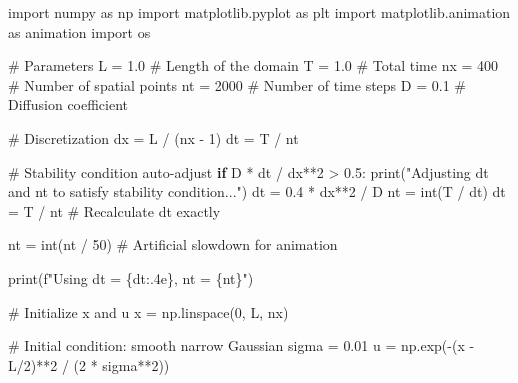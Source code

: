 \documentclass[
  letterpaper,
  enabledeprecatedfontcommands]{report}
\newenvironment{Shaded}{\begin{snugshade}}{\end{snugshade}}
\newcommand{\BuiltInTok}[1]{\textcolor[rgb]{0.00,0.23,0.31}{#1}}
\newcommand{\CommentTok}[1]{\textcolor[rgb]{0.37,0.37,0.37}{#1}}
\newcommand{\ControlFlowTok}[1]{\textcolor[rgb]{0.00,0.23,0.31}{\textbf{#1}}}
\newcommand{\DecValTok}[1]{\textcolor[rgb]{0.68,0.00,0.00}{#1}}
\newcommand{\FloatTok}[1]{\textcolor[rgb]{0.68,0.00,0.00}{#1}}
\newcommand{\ImportTok}[1]{\textcolor[rgb]{0.00,0.46,0.62}{#1}}
\newcommand{\NormalTok}[1]{\textcolor[rgb]{0.00,0.23,0.31}{#1}}
\newcommand{\OperatorTok}[1]{\textcolor[rgb]{0.37,0.37,0.37}{#1}}
\newcommand{\SpecialCharTok}[1]{\textcolor[rgb]{0.37,0.37,0.37}{#1}}
\newcommand{\SpecialStringTok}[1]{\textcolor[rgb]{0.13,0.47,0.30}{#1}}
\newcommand{\StringTok}[1]{\textcolor[rgb]{0.13,0.47,0.30}{#1}}
\begin{document}
\begin{Shaded}
\begin{Highlighting}[]
\ImportTok{import}\NormalTok{ numpy }\ImportTok{as}\NormalTok{ np}
\ImportTok{import}\NormalTok{ matplotlib.pyplot }\ImportTok{as}\NormalTok{ plt}
\ImportTok{import}\NormalTok{ matplotlib.animation }\ImportTok{as}\NormalTok{ animation}
\ImportTok{import}\NormalTok{ os}

\CommentTok{\# Parameters}
\NormalTok{L }\OperatorTok{=} \FloatTok{1.0}        \CommentTok{\# Length of the domain}
\NormalTok{T }\OperatorTok{=} \FloatTok{1.0}        \CommentTok{\# Total time }
\NormalTok{nx }\OperatorTok{=} \DecValTok{400}       \CommentTok{\# Number of spatial points}
\NormalTok{nt }\OperatorTok{=} \DecValTok{2000}      \CommentTok{\# Number of time steps}
\NormalTok{D }\OperatorTok{=} \FloatTok{0.1}        \CommentTok{\# Diffusion coefficient}

\CommentTok{\# Discretization}
\NormalTok{dx }\OperatorTok{=}\NormalTok{ L }\OperatorTok{/}\NormalTok{ (nx }\OperatorTok{{-}} \DecValTok{1}\NormalTok{)}
\NormalTok{dt }\OperatorTok{=}\NormalTok{ T }\OperatorTok{/}\NormalTok{ nt}

\CommentTok{\# Stability condition auto{-}adjust}
\ControlFlowTok{if}\NormalTok{ D }\OperatorTok{*}\NormalTok{ dt }\OperatorTok{/}\NormalTok{ dx}\OperatorTok{**}\DecValTok{2} \OperatorTok{\textgreater{}} \FloatTok{0.5}\NormalTok{:}
    \BuiltInTok{print}\NormalTok{(}\StringTok{"Adjusting dt and nt to satisfy stability condition..."}\NormalTok{)}
\NormalTok{    dt }\OperatorTok{=} \FloatTok{0.4} \OperatorTok{*}\NormalTok{ dx}\OperatorTok{**}\DecValTok{2} \OperatorTok{/}\NormalTok{ D}
\NormalTok{    nt }\OperatorTok{=} \BuiltInTok{int}\NormalTok{(T }\OperatorTok{/}\NormalTok{ dt)}
\NormalTok{    dt }\OperatorTok{=}\NormalTok{ T }\OperatorTok{/}\NormalTok{ nt  }\CommentTok{\# Recalculate dt exactly}

\NormalTok{nt }\OperatorTok{=} \BuiltInTok{int}\NormalTok{(nt }\OperatorTok{/} \DecValTok{50}\NormalTok{)  }\CommentTok{\# Artificial slowdown for animation}

\BuiltInTok{print}\NormalTok{(}\SpecialStringTok{f"Using dt = }\SpecialCharTok{\{}\NormalTok{dt}\SpecialCharTok{:.4e\}}\SpecialStringTok{, nt = }\SpecialCharTok{\{}\NormalTok{nt}\SpecialCharTok{\}}\SpecialStringTok{"}\NormalTok{)}

\CommentTok{\# Initialize x and u}
\NormalTok{x }\OperatorTok{=}\NormalTok{ np.linspace(}\DecValTok{0}\NormalTok{, L, nx)}

\CommentTok{\# Initial condition: smooth narrow Gaussian}
\NormalTok{sigma }\OperatorTok{=} \FloatTok{0.01}
\NormalTok{u }\OperatorTok{=}\NormalTok{ np.exp(}\OperatorTok{{-}}\NormalTok{(x }\OperatorTok{{-}}\NormalTok{ L}\OperatorTok{/}\DecValTok{2}\NormalTok{)}\OperatorTok{**}\DecValTok{2} \OperatorTok{/}\NormalTok{ (}\DecValTok{2} \OperatorTok{*}\NormalTok{ sigma}\OperatorTok{**}\DecValTok{2}\NormalTok{))}


\end{Highlighting}
\end{Shaded}
\end{document}

